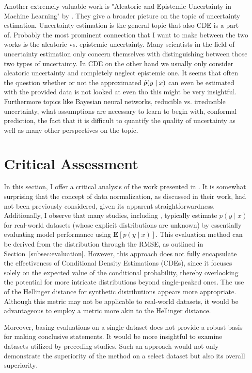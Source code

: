 \documentclass{article}
\newcommand\pef[1]{\hyperref[#1]{Section~\ref{#1}}}
\begin{document}
Another extremely valuable work is "Aleatoric and Epistemic Uncertainty in Machine Learning" by \citep{hullermeier_aleatoric_2021}. They give a broader picture on the topic of uncertainty estimation. Uncertainty estimation is the general topic that also CDE is a part of. Probably the most prominent connection that I want to make between the two works is the aleatoric vs. epistemic uncertainty. Many scientists in the field of uncertainty estimation only concern themselves with distinguishing between those two types of uncertainty. In CDE on the other hand we usually only consider aleatoric uncertainty and completely neglect epistemic one. It seems that often the question whether or not the approximated $\Tilde{p}(y \mid x)$ can even be estimated with the provided data is not looked at even tho this might be very insightful. Furthermore \citep{hullermeier_aleatoric_2021} topics like Bayesian neural networks, reducible vs. irreducible uncertainty, what assumptions are necessary to learn to begin with, conformal prediction, the fact that it is difficult to quantify the quality of uncertainty as well as many other perspectives on the topic.

\section{Critical Assessment}
In this section, I offer a critical analysis of the work presented in \citep{rothfuss2019conditional}. It is somewhat surprising that the concept of data normalization, as discussed in their work, had not been previously considered, given its apparent straightforwardness. Additionally, I observe that many studies, including \citep{rothfuss2019conditional}, typically estimate $p(y \mid x)$ for real-world datasets (whose explicit distributions are unknown) by essentially evaluating model performance using $\mathbf{E}[p(y \mid x)]$. This evaluation method can be derived from the distribution through the RMSE, as outlined in \pef{subsec:evaluation}. However, this approach does not fully encapsulate the effectiveness of Conditional Density Estimations (CDEs), since it focuses solely on the expected value of the conditional probability, thereby overlooking the potential for more intricate distributions beyond single-peaked ones. The use of the Hellinger distance for synthetic distributions appears more appropriate. Although this metric may not be applicable to real-world datasets, it would be advantageous to employ a metric more akin to the Hellinger distance.

Moreover, basing evaluations on a single dataset does not provide a robust basis for making conclusive statements. It would be more insightful to examine datasets utilized by preceding studies. Such an approach would not only demonstrate the superiority of the method on a select dataset but also its overall superiority.
\end{document}
